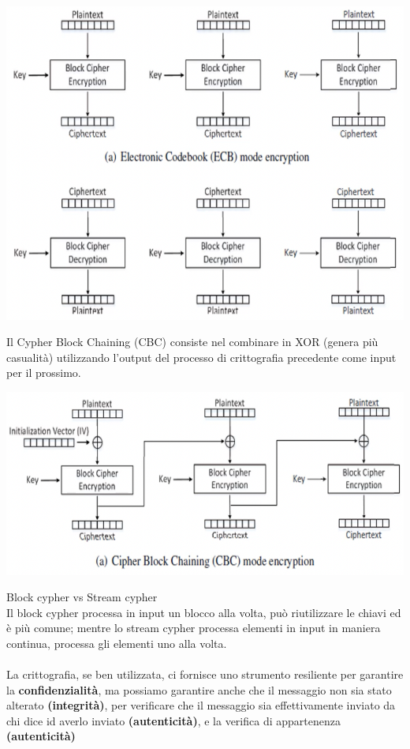 \documentclass[11pt, oneside]{article}   	%
\begin{document}
\begin{center}
\includegraphics[scale=0.5]{ECB}
\end{center}
Il Cypher Block Chaining (CBC) consiste nel combinare in XOR (genera più casualità) utilizzando l'output del processo di crittografia precedente come input per il prossimo.
\begin{center}
\includegraphics[scale=0.5]{CBC}
\end{center}
Block cypher vs Stream cypher \\
Il block cypher processa in input un blocco alla volta, può riutilizzare le chiavi ed è più comune; mentre lo stream cypher processa elementi in input in maniera continua, processa gli elementi uno alla volta.\\\\
La crittografia, se ben utilizzata, ci fornisce uno strumento resiliente per garantire la \textbf{confidenzialità}, ma possiamo garantire anche che il messaggio non sia stato alterato \textbf{(integrità)}, per verificare che il messaggio sia effettivamente inviato da chi dice id averlo inviato \textbf{(autenticità)}, e la verifica di appartenenza \textbf{(autenticità)}\\
\end{document}
